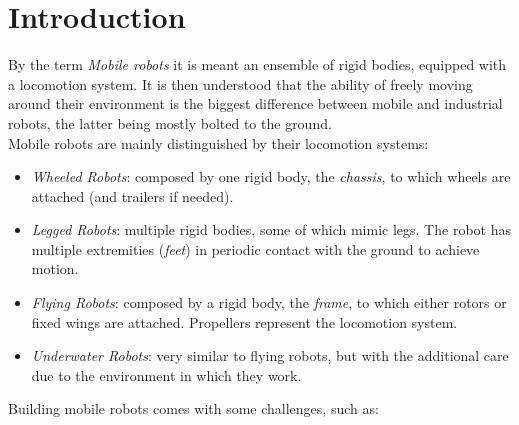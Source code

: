 
\chapter{Introduction}
    By the term \textit{Mobile robots} it is meant an ensemble of rigid bodies, equipped with a locomotion system. It is then understood that the ability of freely moving around their environment is the biggest difference between mobile and industrial robots, the latter being mostly bolted to the ground. \\
    Mobile robots are mainly distinguished by their locomotion systems:
    \begin{itemize}
        \item \textit{Wheeled Robots}: composed by one rigid body, the \textit{chassis}, to which wheels are attached (and trailers if needed).
        \item \textit{Legged Robots}: multiple rigid bodies, some of which mimic legs. The robot has multiple extremities (\textit{feet}) in periodic contact with the ground to achieve motion.
        \item \textit{Flying Robots}: composed by a rigid body, the \textit{frame}, to which either rotors or fixed wings are attached. Propellers represent the locomotion system.
        \item \textit{Underwater Robots}: very similar to flying robots, but with the additional care due to the environment in which they work.
    \end{itemize}
    Building mobile robots comes with some challenges, such as:
